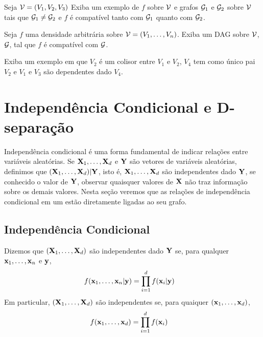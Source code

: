 \begin{exercise}
 Seja ${\mathcal V} = (V_1, V_2, V_3)$
 Exiba um exemplo de $f$ sobre ${\mathcal V}$ e
 grafos ${\mathcal G}_1$ e ${\mathcal G}_2$ sobre ${\mathcal V}$ tais que
 ${\mathcal G}_1 \neq {\mathcal G}_2$ e
 $f$ é compatível tanto com ${\mathcal G}_1$ 
 quanto com ${\mathcal G}_2$.
\end{exercise}

\begin{exercise}
 Seja $f$ uma densidade arbitrária sobre ${\mathcal V} = (V_1,\ldots,V_n)$.
 Exiba um DAG sobre ${\mathcal V}$, ${\mathcal G}$,
 tal que $f$ é compatível com ${\mathcal G}$.
\end{exercise}

\begin{exercise}
 Exiba um exemplo em que $V_2$ é um colisor 
 entre $V_1$ e $V_2$, 
 $V_4$ tem como único pai $V_2$ e
 $V_1$ e $V_3$ são dependentes dado $V_4$.
\end{exercise}

\section{Independência Condicional e D-separação}
\label{sec:d-sep}

Independência condicional é uma forma fundamental de
indicar relações entre variáveis aleatórias.
Se ${\mathbf{X}}_1,\ldots,{\mathbf{X}}_d$ e ${\mathbf{Y}}$ são vetores de variáveis aleatórias,
definimos que $({\mathbf{X}}_1,\ldots,{\mathbf{X}}_d) | {\mathbf{Y}}$, isto é,
${\mathbf{X}}_1,\ldots,{\mathbf{X}}_d$ são independentes dado ${\mathbf{Y}}$, se
conhecido o valor de ${\mathbf{Y}}$, 
observar quaisquer valores de ${\mathbf{X}}$ não traz 
informação sobre os demais valores.
Nesta seção veremos que 
as relações de independência condicional em um \CM
estão diretamente ligadas ao seu grafo.

\subsection{Independência Condicional}
\label{sec:indep}

\begin{definition}
 \label{def:indep}
 Dizemos que $({\mathbf{X}}_1,\ldots,{\mathbf{X}}_d)$ são independentes dado ${\mathbf{Y}}$ se,
 para qualquer ${\mathbf{x}}_1,\ldots,{\mathbf{x}}_n$ e ${\mathbf{y}}$,
 \begin{align*}
  f({\mathbf{x}}_1,\ldots,{\mathbf{x}}_n|{\mathbf{y}})	&= \prod_{i=1}^d f({\mathbf{x}}_i|{\mathbf{y}})
 \end{align*}
 Em particular, $({\mathbf{X}}_1,\ldots,{\mathbf{X}}_d)$ são independentes se,
 para quaiquer $({\mathbf{x}}_1,\ldots,{\mathbf{x}}_d)$,
 \begin{align*}
  f({\mathbf{x}}_1,\ldots,{\mathbf{x}}_d)	&= \prod_{i=1}^d f({\mathbf{x}}_i)
 \end{align*}
\end{definition}


